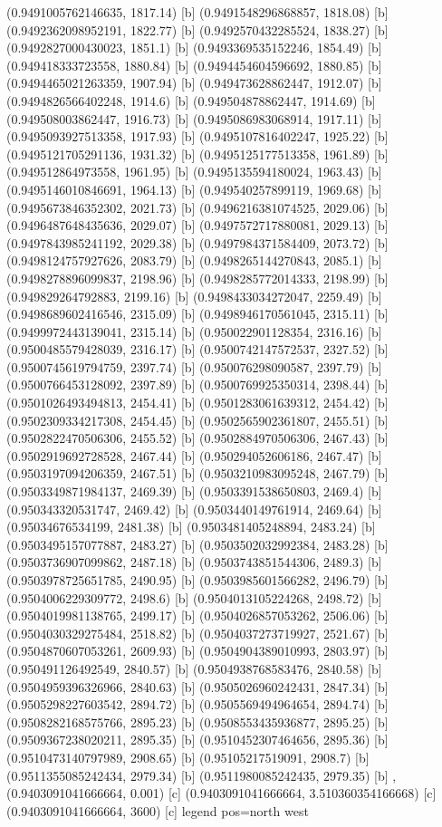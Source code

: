 {{{(0.9491005762146635, 1817.14) [b] 
(0.9491548296868857, 1818.08) [b] 
(0.9492362098952191, 1822.77) [b] 
(0.9492570432285524, 1838.27) [b] 
(0.9492827000430023, 1851.1) [b] 
(0.9493369535152246, 1854.49) [b] 
(0.949418333723558, 1880.84) [b] 
(0.9494454604596692, 1880.85) [b] 
(0.9494465021263359, 1907.94) [b] 
(0.949473628862447, 1912.07) [b] 
(0.9494826566402248, 1914.6) [b] 
(0.949504878862447, 1914.69) [b] 
(0.949508003862447, 1916.73) [b] 
(0.9495086983068914, 1917.11) [b] 
(0.9495093927513358, 1917.93) [b] 
(0.9495107816402247, 1925.22) [b] 
(0.9495121705291136, 1931.32) [b] 
(0.9495125177513358, 1961.89) [b] 
(0.949512864973558, 1961.95) [b] 
(0.9495135594180024, 1963.43) [b] 
(0.9495146010846691, 1964.13) [b] 
(0.949540257899119, 1969.68) [b] 
(0.9495673846352302, 2021.73) [b] 
(0.9496216381074525, 2029.06) [b] 
(0.9496487648435636, 2029.07) [b] 
(0.9497572717880081, 2029.13) [b] 
(0.9497843985241192, 2029.38) [b] 
(0.9497984371584409, 2073.72) [b] 
(0.9498124757927626, 2083.79) [b] 
(0.9498265144270843, 2085.1) [b] 
(0.9498278896099837, 2198.96) [b] 
(0.9498285772014333, 2198.99) [b] 
(0.949829264792883, 2199.16) [b] 
(0.9498433034272047, 2259.49) [b] 
(0.9498689602416546, 2315.09) [b] 
(0.9498946170561045, 2315.11) [b] 
(0.9499972443139041, 2315.14) [b] 
(0.950022901128354, 2316.16) [b] 
(0.9500485579428039, 2316.17) [b] 
(0.9500742147572537, 2327.52) [b] 
(0.9500745619794759, 2397.74) [b] 
(0.950076298090587, 2397.79) [b] 
(0.9500766453128092, 2397.89) [b] 
(0.9500769925350314, 2398.44) [b] 
(0.9501026493494813, 2454.41) [b] 
(0.9501283061639312, 2454.42) [b] 
(0.9502309334217308, 2454.45) [b] 
(0.9502565902361807, 2455.51) [b] 
(0.9502822470506306, 2455.52) [b] 
(0.9502884970506306, 2467.43) [b] 
(0.9502919692728528, 2467.44) [b] 
(0.950294052606186, 2467.47) [b] 
(0.9503197094206359, 2467.51) [b] 
(0.9503210983095248, 2467.79) [b] 
(0.9503349871984137, 2469.39) [b] 
(0.9503391538650803, 2469.4) [b] 
(0.950343320531747, 2469.42) [b] 
(0.9503440149761914, 2469.64) [b] 
(0.95034676534199, 2481.38) [b] 
(0.9503481405248894, 2483.24) [b] 
(0.9503495157077887, 2483.27) [b] 
(0.9503502032992384, 2483.28) [b] 
(0.9503736907099862, 2487.18) [b] 
(0.9503743851544306, 2489.3) [b] 
(0.9503978725651785, 2490.95) [b] 
(0.9503985601566282, 2496.79) [b] 
(0.9504006229309772, 2498.6) [b] 
(0.9504013105224268, 2498.72) [b] 
(0.9504019981138765, 2499.17) [b] 
(0.9504026857053262, 2506.06) [b] 
(0.9504030329275484, 2518.82) [b] 
(0.9504037273719927, 2521.67) [b] 
(0.9504870607053261, 2609.93) [b] 
(0.9504904389010993, 2803.97) [b] 
(0.950491126492549, 2840.57) [b] 
(0.9504938768583476, 2840.58) [b] 
(0.9504959396326966, 2840.63) [b] 
(0.9505026960242431, 2847.34) [b] 
(0.9505298227603542, 2894.72) [b] 
(0.9505569494964654, 2894.74) [b] 
(0.9508282168575766, 2895.23) [b] 
(0.9508553435936877, 2895.25) [b] 
(0.9509367238020211, 2895.35) [b] 
(0.9510452307464656, 2895.36) [b] 
(0.9510473140797989, 2908.65) [b] 
(0.95105217519091, 2908.7) [b] 
(0.9511355085242434, 2979.34) [b] 
(0.9511980085242435, 2979.35) [b] 
},{(0.9403091041666664, 0.001) [c] 
(0.9403091041666664, 3.510360354166668) [c] 
(0.9403091041666664, 3600) [c] 
}}}{legend pos=north west}